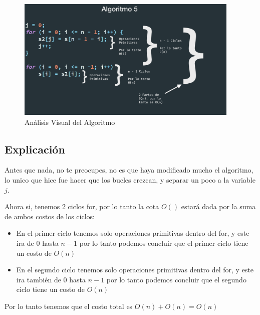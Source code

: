 \documentclass[12pt, fleqn]{article}                            %
\theoremstyle{break}                                            %
\begin{document}
        \begin{figure}[h]
            \centering
            \includegraphics[width=0.95\textwidth]{Algoritmo5}
            \caption{Análisis Visual del Algoritmo}
        \end{figure}

    \vspace{1em}
    \subsection{Explicación}

        Antes que nada, no te preocupes, no es que haya modificado mucho el algoritmo, lo unico
        que hice fue hacer que los bucles crezcan, y separar un poco a la variable $j$.

        Ahora si, tenemos 2 ciclos for, por lo tanto la cota $O()$ estará dada por la suma de 
        ambos costos de los ciclos:
        \begin{itemize}
            \item 
                En el primer ciclo tenemos solo operaciones primitivas dentro del for,
                y este ira de 0 hasta $n -1$ por lo tanto podemos concluir que el primer ciclo
                tiene un costo de $O(n)$
            \item 
                En el segundo ciclo tenemos solo operaciones primitivas dentro del for,
                y este ira también de 0 hasta $n -1$ por lo tanto podemos concluir que el segundo ciclo
                tiene un costo de $O(n)$
        \end{itemize}

        Por lo tanto tenemos que el costo total es $O(n) + O(n) = O(n)$
\end{document}
